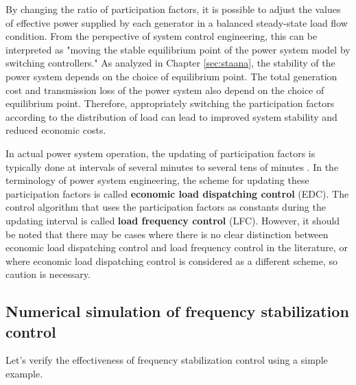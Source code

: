\documentclass[graybox, envcountchap]{svmult}
\begin{document}
By changing the ratio of participation factors, it is possible to adjust the
values of effective power supplied by each generator in a balanced steady-state
load flow condition. From the perspective of system control engineering, this
can be interpreted as "moving the stable equilibrium point of the power system
model by switching controllers." As analyzed in Chapter \ref{sec:staana}, the
stability of the power system depends on the choice of equilibrium point. The
total generation cost and transmission loss of the power system also depend on
the choice of equilibrium point. Therefore, appropriately switching the
participation factors according to the distribution of load can lead to improved
system stability and reduced economic costs.

In actual power system operation, the updating of participation factors is
typically done at intervals of several minutes to several tens of minutes
\cite[Section 11.1]{kundur1994power}. In the terminology of power system
engineering, the scheme for updating these participation factors is called
\textbf{economic load dispatching control} (EDC). The control algorithm that uses the participation factors as constants
during the updating interval is called \textbf{load frequency control}
(LFC). However, it should be noted that there may
be cases where there is no clear distinction between economic load dispatching
control and load frequency control in the literature, or where economic load
dispatching control is considered as a different scheme, so caution is
necessary.


\subsection{Numerical simulation of frequency stabilization control}

Let's verify the effectiveness of frequency stabilization control using a simple
example.
\end{document}
